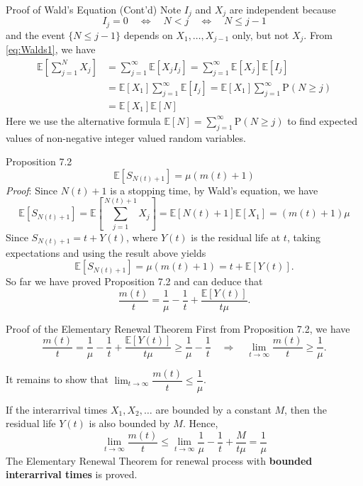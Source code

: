 \documentclass[letterpaper,handout, mathserif]{beamer}
\def\Sum{\sum\nolimits}
\def\p{\mathrm P}
\def\E{\mathbb E}
\begin{document}
\begin{frame}{Proof of Wald's Equation (Cont'd)}
Note $I_j$ and $X_j$ are independent because
$$I_j=0 \quad\Leftrightarrow\quad N < j \quad\Leftrightarrow\quad N \le j-1$$
and the event $\{N\le j-1\}$ depends on $X_1,\ldots,X_{j-1}$ only, but not $X_j.$
From \eqref{eq:Walds1}, we have
\begin{align*}
\E\left[\Sum_{j=1}^N X_j\right]
&= \Sum_{j=1}^{\infty}\E[X_jI_j]= \Sum_{j=1}^{\infty}\E[X_j]\E[I_j]\\[2pt]
&= \E[X_1]\Sum_{j=1}^{\infty}\E[I_j]= \E[X_1]\Sum_{j=1}^{\infty}\p(N\ge j)\\[2pt]
&= \E[X_1]\E[N]
\end{align*}
Here we use the alternative formula $\E[N]=\Sum_{j=1}^{\infty}\p(N\ge j)$ to find expected values of non-negative integer valued random variables. %
\end{frame}
\begin{frame}{Proposition 7.2}
$$\E[S_{N(t)+1}]=\mu(m(t) +1)$$
{\em Proof}:
Since $N(t)+1$ is a stopping time, by Wald's equation, we have
$$
\E[S_{N(t)+1}]=\E\left[\sum_{j=1}^{N(t)+1} X_j\right]=\E[N(t)+1]\E[X_1]=(m(t)+1)\mu
$$
Since $S_{N(t)+1} = t + Y(t)$, where $Y(t)$ is the residual life at $t$, taking expectations and using the result above yields
$$\E[S_{N(t)+1}]=\mu(m(t) +1) = t +\E[Y(t)].$$
So far we have proved Proposition 7.2 and can deduce that
$$\frac{m(t)}{t}= \frac{1}{\mu}-\frac{1}{t}+\frac{\E[Y(t)]}{t\mu}.$$
\end{frame}
\begin{frame}{Proof of the Elementary Renewal Theorem}
First from Proposition 7.2, we have
$$\frac{m(t)}{t}= \frac{1}{\mu}-\frac{1}{t}+\frac{\E[Y(t)]}{t\mu}\ge\frac{1}{\mu}-\frac{1}{t}
\quad\Rightarrow\quad \lim_{t\to\infty}\frac{m(t)}{t}\ge \frac{1}{\mu}.$$

It remains to show that $\lim_{t\to\infty}\dfrac{m(t)}{t}\le \dfrac{1}{\mu}$.\par\medskip

If the interarrival times $X_1, X_2, \ldots$ are bounded by a constant $M$,
then the residual life $Y(t)$ is also bounded by $M$. Hence,
\[
 \lim_{t\to\infty}\frac{m(t)}{t}\le\lim_{t\to\infty} \frac{1}{\mu}-\frac{1}{t}+\frac{M}{t\mu}=\frac{1}{\mu}
\]
The Elementary Renewal Theorem for renewal process with {\bf bounded interarrival times} is proved.
\end{frame}
\end{document}
